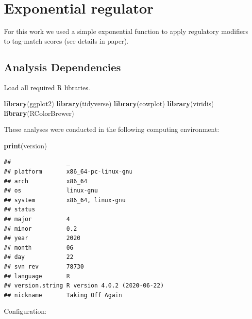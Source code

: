 \documentclass[
]{book}
\newenvironment{Shaded}{\begin{snugshade}}{\end{snugshade}}
\newcommand{\KeywordTok}[1]{\textcolor[rgb]{0.13,0.29,0.53}{\textbf{#1}}}
\newcommand{\NormalTok}[1]{#1}
\begin{document}
\hypertarget{exponential-regulator}{%
\chapter{Exponential regulator}\label{exponential-regulator}}

For this work we used a simple exponential function to apply regulatory modifiers to tag-match scores (see details in paper).

\hypertarget{analysis-dependencies}{%
\section{Analysis Dependencies}\label{analysis-dependencies}}

Load all required R libraries.

\begin{Shaded}
\begin{Highlighting}[]
\KeywordTok{library}\NormalTok{(ggplot2)}
\KeywordTok{library}\NormalTok{(tidyverse)}
\KeywordTok{library}\NormalTok{(cowplot)}
\KeywordTok{library}\NormalTok{(viridis)}
\KeywordTok{library}\NormalTok{(RColorBrewer)}
\end{Highlighting}
\end{Shaded}

These analyses were conducted in the following computing environment:

\begin{Shaded}
\begin{Highlighting}[]
\KeywordTok{print}\NormalTok{(version)}
\end{Highlighting}
\end{Shaded}

\begin{verbatim}
##                _                           
## platform       x86_64-pc-linux-gnu         
## arch           x86_64                      
## os             linux-gnu                   
## system         x86_64, linux-gnu           
## status                                     
## major          4                           
## minor          0.2                         
## year           2020                        
## month          06                          
## day            22                          
## svn rev        78730                       
## language       R                           
## version.string R version 4.0.2 (2020-06-22)
## nickname       Taking Off Again
\end{verbatim}

Configuration:
\end{document}
